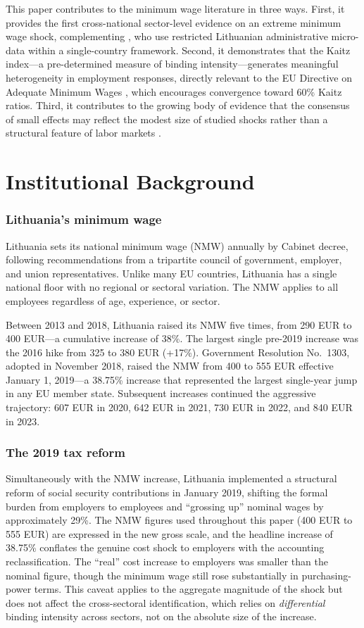 \documentclass[12pt]{article}
\begin{document}
This paper contributes to the minimum wage literature in three ways. First, it provides the first cross-national sector-level evidence on an extreme minimum wage shock, complementing \citet{zilio2023lithuania}, who use restricted Lithuanian administrative micro-data within a single-country framework. Second, it demonstrates that the Kaitz index---a pre-determined measure of binding intensity---generates meaningful heterogeneity in employment responses, directly relevant to the EU Directive on Adequate Minimum Wages \citep{eu2022directive}, which encourages convergence toward 60\% Kaitz ratios. Third, it contributes to the growing body of evidence that the consensus of small effects may reflect the modest size of studied shocks rather than a structural feature of labor markets \citep{jardim2022minimum, clemens2021}.

\section{Institutional Background}

\subsubsection*{Lithuania's minimum wage} Lithuania sets its national minimum wage (NMW) annually by Cabinet decree, following recommendations from a tripartite council of government, employer, and union representatives. Unlike many EU countries, Lithuania has a single national floor with no regional or sectoral variation. The NMW applies to all employees regardless of age, experience, or sector.

Between 2013 and 2018, Lithuania raised its NMW five times, from 290 EUR to 400 EUR---a cumulative increase of 38\%. The largest single pre-2019 increase was the 2016 hike from 325 to 380 EUR (+17\%). Government Resolution No.~1303, adopted in November 2018, raised the NMW from 400 to 555 EUR effective January 1, 2019---a 38.75\% increase that represented the largest single-year jump in any EU member state. Subsequent increases continued the aggressive trajectory: 607 EUR in 2020, 642 EUR in 2021, 730 EUR in 2022, and 840 EUR in 2023.

\subsubsection*{The 2019 tax reform} Simultaneously with the NMW increase, Lithuania implemented a structural reform of social security contributions in January 2019, shifting the formal burden from employers to employees and ``grossing up'' nominal wages by approximately 29\%. The NMW figures used throughout this paper (400 EUR to 555 EUR) are expressed in the new gross scale, and the headline increase of 38.75\% conflates the genuine cost shock to employers with the accounting reclassification. The ``real'' cost increase to employers was smaller than the nominal figure, though the minimum wage still rose substantially in purchasing-power terms. This caveat applies to the aggregate magnitude of the shock but does not affect the cross-sectoral identification, which relies on \textit{differential} binding intensity across sectors, not on the absolute size of the increase.
\end{document}
